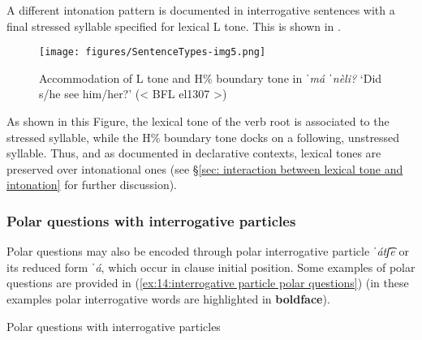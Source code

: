 A different intonation pattern is documented in interrogative sentences with a final stressed syllable specified for lexical L tone. This is shown in .


\begin{figure}
\texttt{[image: figures/SentenceTypes-img5.png]}
\caption{
\label{fig: L tone plus H boundary tone}
Accommodation of L tone and H\% boundary tone in \textit{ˈmá ˈnèli?} `Did s/he see him/her?' (< BFL el1307 >)}
\end{figure}

As shown in this Figure, the lexical tone of the verb root is associated to the stressed syllable, while the H\% boundary tone docks on a following, unstressed syllable. Thus, and as documented in declarative contexts, lexical tones are preserved over intonational ones (see §\ref{sec: interaction between lexical tone and intonation} for further discussion).

\subsubsection{Polar questions with interrogative particles}
\label{subsubsec: polar questions with interrogative particles}

Polar questions may also be encoded through polar interrogative particle \textit{ˈátʃ͡e} or its reduced form \textit{ˈá}, which occur in clause initial position. Some examples of polar questions are provided in (\ref{ex:14:interrogative particle polar questions}) (in these examples polar interrogative words are highlighted in \textbf{boldface}).

\ea\label{ex:14:interrogative particle polar questions}
{Polar questions with interrogative particles}

